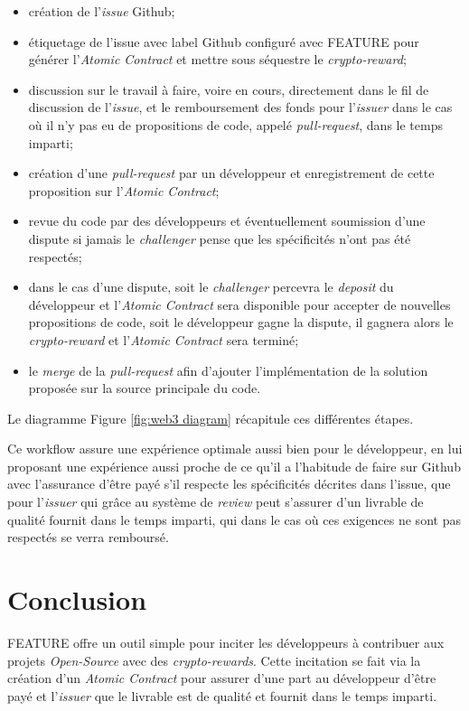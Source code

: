\documentclass[
	a4paper, %
	10pt, %
	unnumberedsections, %
	twoside, %
]{LTJournalArticle}
\begin{document}
\begin{itemize}
\def\labelenumi{\arabic{enumi}.}
\item
  création de l'\emph{issue} Github;
\item
  étiquetage de l'issue avec label Github configuré avec FEATURE pour générer l'\emph{Atomic Contract} et mettre sous séquestre le \emph{crypto-reward};
\item
  discussion sur le travail à faire, voire en cours, directement dans le fil de discussion de l'\emph{issue}, et le remboursement des fonds pour l'\emph{issuer} dans le cas où il n'y pas eu de propositions de code, appelé \emph{pull-request}, dans le temps imparti;
\item
  création d'une \emph{pull-request} par un développeur et enregistrement de cette proposition sur l'\emph{Atomic Contract};
\item
  revue du code par des développeurs et éventuellement soumission d'une dispute si jamais le \emph{challenger} pense que les spécificités n'ont pas été respectés;
\item
  dans le cas d'une dispute, soit le \emph{challenger} percevra le \emph{deposit} du développeur et l'\emph{Atomic Contract} sera disponible pour accepter de nouvelles propositions de code, soit le développeur gagne la dispute, il gagnera alors le \emph{crypto-reward} et l'\emph{Atomic Contract} sera terminé;
\item
  le \emph{merge} de la \emph{pull-request} afin d'ajouter l'implémentation de la solution proposée sur la source principale du code.
\end{itemize}

Le diagramme Figure \ref{fig:web3 diagram} récapitule ces différentes étapes.

Ce workflow assure une expérience optimale aussi bien pour le développeur, en lui proposant une expérience aussi proche de ce qu'il a l'habitude de faire sur Github avec l'assurance d'être payé s'il respecte les spécificités décrites dans l'issue, que pour l'\emph{issuer} qui grâce au système de \emph{review} peut s'assurer d'un livrable de qualité fournit dans le temps imparti, qui dans le cas où ces exigences ne sont pas respectés se verra remboursé.

\section{Conclusion}

FEATURE offre un outil simple pour inciter les développeurs à contribuer aux projets \emph{Open-Source} avec des \emph{crypto-rewards}. Cette incitation se fait via la création d'un \emph{Atomic Contract} pour assurer d'une part au développeur d'être payé et l'\emph{issuer} que le livrable est de qualité et fournit dans le temps imparti.
\end{document}
